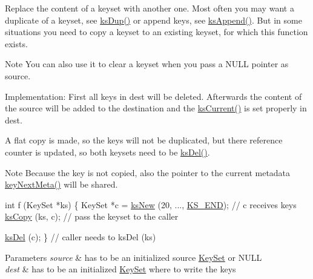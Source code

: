 Replace the content of a keyset with another one. Most often you may want a duplicate of a keyset, see \hyperlink{group__keyset_gac59e4b328245463f1451f68d5106151c}{ks\+Dup()} or append keys, see \hyperlink{group__keyset_ga21eb9c3a14a604ee3a8bdc779232e7b7}{ks\+Append()}. But in some situations you need to copy a keyset to an existing keyset, for which this function exists.

\begin{DoxyNote}{Note}
You can also use it to clear a keyset when you pass a N\+U\+LL pointer as {\ttfamily source}.
\end{DoxyNote}
\begin{DoxyParagraph}{Implementation\+:}
First all keys in {\ttfamily dest} will be deleted. Afterwards the content of the source will be added to the destination and the \hyperlink{group__keyset_ga4287b9416912c5f2ab9c195cb74fb094}{ks\+Current()} is set properly in {\ttfamily dest}.
\end{DoxyParagraph}
A flat copy is made, so the keys will not be duplicated, but there reference counter is updated, so both keysets need to be \hyperlink{group__keyset_ga27e5c16473b02a422238c8d970db7ac8}{ks\+Del()}.

\begin{DoxyNote}{Note}
Because the key is not copied, also the pointer to the current metadata \hyperlink{group__keymeta_ga4c88342f580a4291455a801af71ce048}{key\+Next\+Meta()} will be shared.
\end{DoxyNote}

\begin{DoxyCode}
\textcolor{keywordtype}{int} f (KeySet *ks)
\{
        KeySet *c = \hyperlink{group__keyset_ga671e1aaee3ae9dc13b4834a4ddbd2c3c}{ksNew} (20, ..., \hyperlink{group__keyset_ga7a28fce3773b2c873c94ac80b8b4cd54}{KS\_END});
        \textcolor{comment}{// c receives keys}
        \hyperlink{group__keyset_gaba1f1dbea191f4d7e7eb3e4296ae7d5e}{ksCopy} (ks, c); \textcolor{comment}{// pass the keyset to the caller}

        \hyperlink{group__keyset_ga27e5c16473b02a422238c8d970db7ac8}{ksDel} (c);
\}       \textcolor{comment}{// caller needs to ksDel (ks)}
\end{DoxyCode}



\begin{DoxyParams}{Parameters}
{\em source} & has to be an initialized source \hyperlink{classkdb_1_1KeySet}{Key\+Set} or N\+U\+LL \\
\hline
{\em dest} & has to be an initialized \hyperlink{classkdb_1_1KeySet}{Key\+Set} where to write the keys \\
\hline
\end{DoxyParams}

